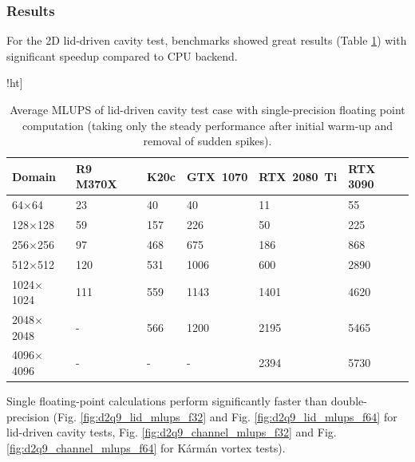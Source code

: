 \subsubsection{Results}

For the 2D lid-driven cavity test, benchmarks showed great results (Table \ref{tab:lid-mlups-all}) with significant speedup compared to CPU backend.

\begin{table}!ht]
	\centering
	\begin{tabular}{ |p{1.7cm}||p{1.6cm}|p{0.9cm}|p{1.5cm}|p{1.7cm}|p{1.5cm}|  }
		\hline
		Domain & R9 M370X & K20c & GTX~1070 & RTX~2080~Ti & RTX 3090 \\
		\hline
		64$\times$64   & 23 & 40 & 40  & 11  & 55  \\
		128$\times$128   & 59 & 157 & 226  & 50   & 225  \\
		256$\times$256   & 97 & 468 & 675  & 186   & 868  \\
		512$\times$512   & 120 & 531 & 1006  & 600   & 2890  \\
		1024$\times$1024   & 111 & 559 & 1143   & 1401   & 4620  \\
		2048$\times$2048   & - & 566 & 1200  & 2195  & 5465  \\
		4096$\times$4096   & - & - & -  & 2394  & 5730  \\
		\hline
	\end{tabular}
	\caption{Average MLUPS of lid-driven cavity test case with single-precision floating point computation (taking only the steady performance after initial warm-up and removal of sudden spikes).}
	\label{tab:lid-mlups-all}
\end{table}

Single floating-point calculations perform significantly faster than double-precision (Fig. \ref{fig:d2q9_lid_mlups_f32} and Fig. \ref{fig:d2q9_lid_mlups_f64} for lid-driven cavity tests, Fig. \ref{fig:d2q9_channel_mlups_f32} and Fig. \ref{fig:d2q9_channel_mlups_f64} for Kármán vortex tests).

